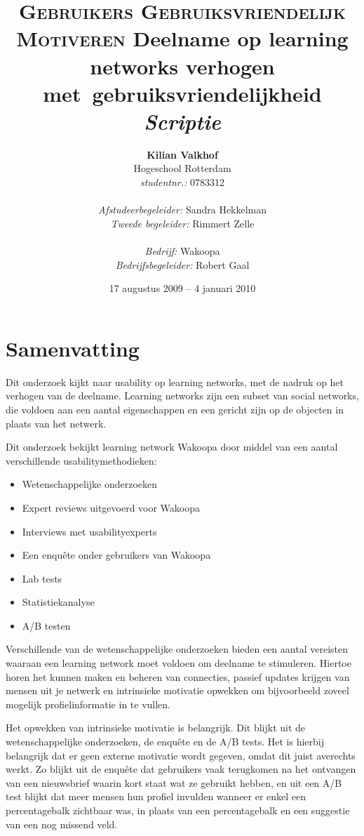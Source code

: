 \documentclass[a4paper, 10pt, pdftex]{report}
\title{\textsc{Gebruikers Gebruiksvriendelijk Motiveren}
  \linebreak Deelname op learning networks verhogen met~gebruiksvriendelijkheid \linebreak \linebreak \emph{Scriptie}}
\author{\textbf{Kilian Valkhof}\\
  Hogeschool Rotterdam\\
  \textit{studentnr.:} 0783312\\
  \\
  \textit{Afstudeerbegeleider:} Sandra Hekkelman\\
  \textit{Tweede begeleider:} Rimmert Zelle\\
  \\
  \textit{Bedrijf:} Wakoopa\\
  \textit{Bedrijfsbegeleider:} Robert Gaal}
\date{17 augustus 2009 -- 4 januari 2010}
\begin{document}
  \normalem
  \maketitle

  \newpage
  \chapter*{Samenvatting}
    Dit onderzoek kijkt naar usability op learning networks, met de nadruk op het verhogen van de deelname. Learning networks zijn een subset van social networks, die voldoen aan een aantal eigenschappen en een gericht zijn op de objecten in plaats van het netwerk.

    Dit onderzoek bekijkt learning network Wakoopa door middel van een aantal verschillende usabilitymethodieken:
    \begin{itemize}
      \item Wetenschappelijke onderzoeken
      \item Expert reviews uitgevoerd voor Wakoopa
      \item Interviews met usabilityexperts
      \item Een enqu\^ete onder gebruikers van Wakoopa
      \item Lab tests
      \item Statistiekanalyse
      \item A/B testen
    \end{itemize}

    Verschillende van de wetenschappelijke onderzoeken bieden een aantal vereisten waaraan een learning network moet voldoen om deelname te stimuleren. Hiertoe horen het kunnen maken en beheren van connecties, passief updates krijgen van mensen uit je netwerk en intrinsieke motivatie opwekken om bijvoorbeeld zoveel mogelijk profielinformatie in te vullen.

    Het opwekken van intrinsieke motivatie is belangrijk. Dit blijkt uit de wetenschappelijke onderzoeken, de enqu\^ete en de A/B tests. Het is hierbij belangrijk dat er geen externe motivatie wordt gegeven, omdat dit juist averechts werkt. Zo blijkt uit de enqu\^ete dat gebruikers vaak terugkomen na het ontvangen van een nieuwsbrief waarin kort staat wat ze gebruikt hebben, en uit een A/B test blijkt dat meer mensen hun profiel invulden wanneer er enkel een percentagebalk zichtbaar was, in plaats van een percentagebalk en een suggestie van een nog missend veld.
\end{document}
